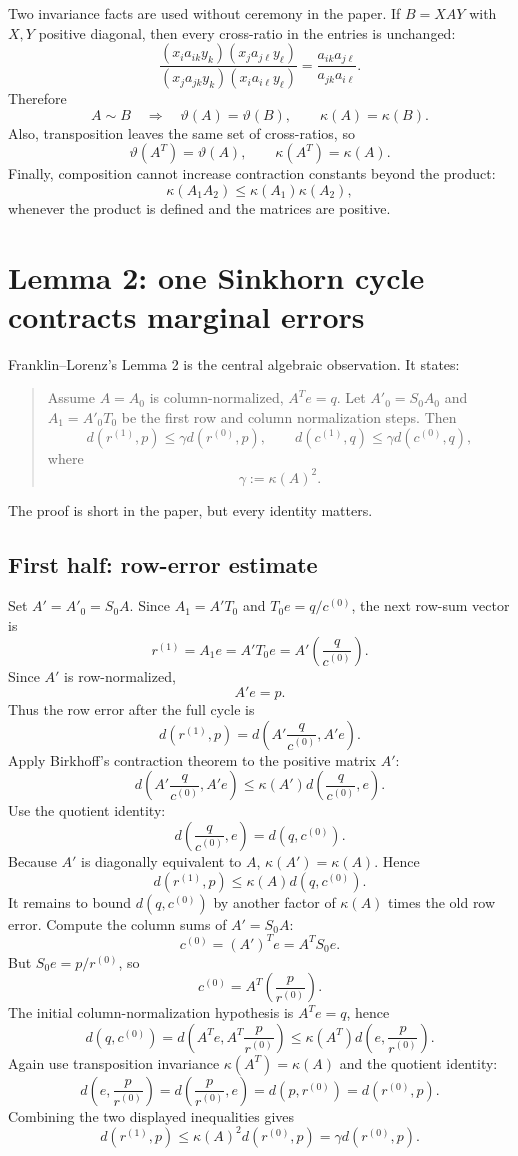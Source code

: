Two invariance facts are used without ceremony in the paper.  If $B=XAY$ with
$X,Y$ positive diagonal, then every cross-ratio in the entries is unchanged:
\[
  \frac{(x_i a_{ik}y_k)(x_j a_{j\ell}y_\ell)}
       {(x_j a_{jk}y_k)(x_i a_{i\ell}y_\ell)}
  =\frac{a_{ik}a_{j\ell}}{a_{jk}a_{i\ell}}.
\]
Therefore
\[
  A\sim B \quad\Longrightarrow\quad
  \vartheta(A)=\vartheta(B),\qquad \kappa(A)=\kappa(B).
\]
Also, transposition leaves the same set of cross-ratios, so
\[
  \vartheta(A^T)=\vartheta(A),\qquad \kappa(A^T)=\kappa(A).
\]
Finally, composition cannot increase contraction constants beyond the product:
\[
  \kappa(A_1A_2)\le \kappa(A_1)\kappa(A_2),
\]
whenever the product is defined and the matrices are positive.

\section*{Lemma 2: one Sinkhorn cycle contracts marginal errors}
Franklin--Lorenz's Lemma 2 is the central algebraic observation.  It states:

\begin{quote}
Assume $A=A_0$ is column-normalized, $A^T e=q$.  Let $A'_0=S_0A_0$ and
$A_1=A'_0T_0$ be the first row and column normalization steps.  Then
\[
  d(r^{(1)},p)\le \gamma d(r^{(0)},p),
  \qquad
  d(c^{(1)},q)\le \gamma d(c^{(0)},q),
\]
where
\[
  \gamma:=\kappa(A)^2.
\]
\end{quote}

The proof is short in the paper, but every identity matters.

\subsection*{First half: row-error estimate}
Set $A'=A'_0=S_0A$.  Since $A_1=A'T_0$ and $T_0e=q/c^{(0)}$, the next row-sum vector is
\[
  r^{(1)}=A_1e=A'T_0e=A'\left(\frac{q}{c^{(0)}}\right).
\]
Since $A'$ is row-normalized,
\[
  A'e=p.
\]
Thus the row error after the full cycle is
\[
  d(r^{(1)},p)
  =d\left(A'\frac{q}{c^{(0)}},A'e\right).
\]
Apply Birkhoff's contraction theorem to the positive matrix $A'$:
\[
  d\left(A'\frac{q}{c^{(0)}},A'e\right)
  \le \kappa(A')d\left(\frac{q}{c^{(0)}},e\right).
\]
Use the quotient identity:
\[
  d\left(\frac{q}{c^{(0)}},e\right)=d(q,c^{(0)}).
\]
Because $A'$ is diagonally equivalent to $A$, $\kappa(A')=\kappa(A)$.  Hence
\[
  d(r^{(1)},p)\le \kappa(A)d(q,c^{(0)}).
\]
It remains to bound $d(q,c^{(0)})$ by another factor of $\kappa(A)$ times the old row
error.  Compute the column sums of $A'=S_0A$:
\[
  c^{(0)}=(A')^Te=A^T S_0e.
\]
But $S_0e=p/r^{(0)}$, so
\[
  c^{(0)}=A^T\left(\frac{p}{r^{(0)}}\right).
\]
The initial column-normalization hypothesis is $A^Te=q$, hence
\[
  d(q,c^{(0)})
  =d\left(A^Te,A^T\frac{p}{r^{(0)}}\right)
  \le \kappa(A^T)d\left(e,\frac{p}{r^{(0)}}\right).
\]
Again use transposition invariance $\kappa(A^T)=\kappa(A)$ and the quotient identity:
\[
  d\left(e,\frac{p}{r^{(0)}}\right)=d\left(\frac{p}{r^{(0)}},e\right)=d(p,r^{(0)})=d(r^{(0)},p).
\]
Combining the two displayed inequalities gives
\[
  d(r^{(1)},p)
  \le \kappa(A)^2 d(r^{(0)},p)
  =\gamma d(r^{(0)},p).
\]

